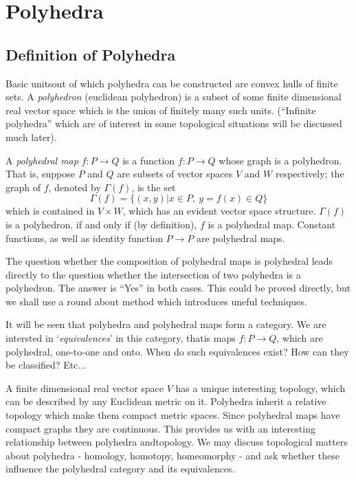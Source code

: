 
\chapter{Polyhedra}\label{chap1}

\section{Definition of Polyhedra}\label{chap1-sec1.1}

Basic units\pageoriginale out of which polyhedra can be constructed are convex hulls of finite sets. A {\em polyhedron} (euclidean polyhedron) is a subset of some finite dimensional real vector space which is the union of finitely many such units. (``Infinite polyhedra'' which are of interest in some topological situations will be discussed much later).

A {\em polyhedral map} $f:P\to Q$ is a function $f:P\to Q$ whose graph is a polyhedron. That is, suppose $P$ and $Q$ are subsets of vector spaces $V$ and $W$ respectively; the graph of $f$, denoted by $\Gamma(f)$, is the set
$$
\Gamma(f)=\{(x,y)|x\in P,\ y=f(x)\in Q\}
$$
which is contained in $V \times W$, which has an evident vector space structure. $\Gamma(f)$ is a polyhedron, if and only if (by definition), $f$ is a polyhedral map. Constant functions, as well as identity function $P\to P$ are polyhedral maps.

The question whether the composition of polyhedral maps is polyhedral leads directly to the question whether the intersection of two polyhedra is a polyhedron. The answer is ``Yes'' in both cases. This could be proved directly, but we shall use a round about method which introduces uneful techniques. 

It will be seen that polyhedra and polyhedral maps form a category. We are intersted in `{\em equivalences}' in this category, that\pageoriginale is maps $f:P\to Q$, which are polyhedral, one-to-one and onto. When do such equivalences exist? How can they be classified? Etc...

A finite dimensional real vector space $V$ has a unique interesting topology, which can be described by any Euclidean metric on it. Polyhedra inherit a relative topology which make them compact metric spaces. Since polyhedral maps have compact graphs they are continuous. This provides us with an interesting relationship between polyhedra and\break topology. We may discuss topological matters about polyhedra - homology, homotopy, homeomorphy - and ask whether these influence the polyhedral category and its equivalences.

